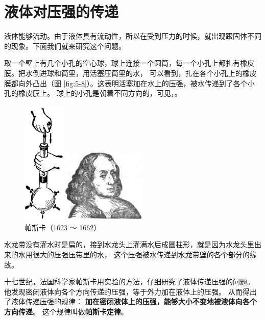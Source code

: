 \section{液体对压强的传递}\label{sec:5-3}


液体能够流动。由于液体具有流动性，所以在受到压力的时候，就出现跟固体不同的现象。下面我们就来研究这个问题。

取一个壁上有几个小孔的空心球，球上连接一个圆筒，每一个小孔上都扎有橡皮膜。把水倒进球和筒里，用活塞压筒里的水，
可以看到，扎在各个小孔上的橡皮膜都向外凸出（图 \ref{fig:5-8}）。这表明活塞加在水上的压强，被水传递到了各个小孔的橡皮膜上。
球上的小孔是朝着不同方向的，可见，。

\begin{figure}[htbp]
    \centering
    \begin{minipage}{6cm}
    \centering
    \includegraphics[width=2cm]{../pic/czwl1-ch5-8}
    \caption{}\label{fig:5-8}
    \end{minipage}
    \qquad
    \begin{minipage}{8cm}
    \centering
    \includegraphics[width=4cm]{../pic/czwl1-ch5-9}
    \caption*{帕斯卡（1623 ～ 1662）}\label{fig:5-pascal}
    \end{minipage}
\end{figure}

水龙带没有灌水时是扁的，接到水龙头上灌满水后成圆柱形，就是因为水龙头里出来的水用很大的压强压带里的水，
这个压强被水传递到水龙带壁的各个部分的缘故。

十七世纪，法国科学家帕斯卡用实验的方法，仔细研究了液体传递压强的问题。
他发现密闭液体向各个方向传递的压强，等于外力加在液体上的压强。
从而得出了液体传递压强的规律：
\textbf{加在密闭液体上的压强，能够大小不变地被液体向各个方向传递}。
这个规律叫做\textbf{帕斯卡定律}。


